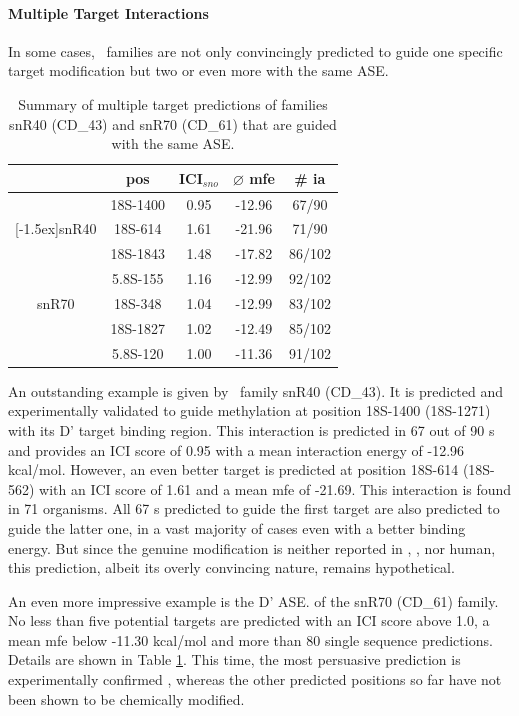 \paragraph{\textbf{Multiple Target Interactions}}
In some cases, \sno\ families are not only convincingly predicted to
guide one specific target modification but two or even more with the
same ASE.
\begin{table}
  \caption{Summary of multiple target predictions of families 
    snR40 (CD\_43) and snR70 (CD\_61) that are guided with the same ASE.}
  \label{tab:redundant_predictions}
  \begin{center}
    \begin{footnotesize}
      \begin{tabular}{c|c|c|c|c}
        &pos&ICI$_{sno}$&$\varnothing$
          mfe&\# ia\\
        \hline
        &18S-1400&0.95&-12.96&67/90\\
        \raisebox{1.5ex}[-1.5ex]{snR40}&18S-614&1.61&-21.96&71/90\\
        \hline
        &18S-1843&1.48&-17.82&86/102\\
        &5.8S-155&1.16&-12.99&92/102\\
        snR70&18S-348&1.04&-12.99&83/102\\
        &18S-1827&1.02&-12.49&85/102\\
        &5.8S-120&1.00&-11.36&91/102\\
      \end{tabular}
    \end{footnotesize}
  \end{center}
\end{table}
An outstanding example is given by \cd\ family snR40 (CD\_43). It is
predicted and experimentally validated \cite{Lowe:1999} to guide
methylation at position 18S-1400 (18S-1271) with its D' target binding
region. This interaction is predicted in 67 out of 90 \sno s and
provides an ICI score of 0.95 with a mean interaction energy of -12.96
kcal/mol. However, an even better target is predicted at position
18S-614 (18S-562) with an ICI score of 1.61 and a mean mfe of
-21.69. This interaction is found in 71 organisms. All 67 \sno s
predicted to guide the first target are also predicted to guide the
latter one, in a vast majority of cases even with a better binding
energy. But since the genuine modification is neither reported in
\sce, \ncr, nor human, this prediction, albeit its overly convincing
nature, remains hypothetical.

An even more impressive example is the D' ASE. of the snR70 (CD\_61)
family.  No less than five potential targets are predicted with an ICI
score above 1.0, a mean mfe below -11.30 kcal/mol and more than 80
single sequence predictions. Details are shown in Table
\ref{tab:redundant_predictions}. This time, the most persuasive
prediction is experimentally confirmed \cite{Lowe:1999}, whereas the
other predicted positions so far have not been shown to be chemically
modified.

